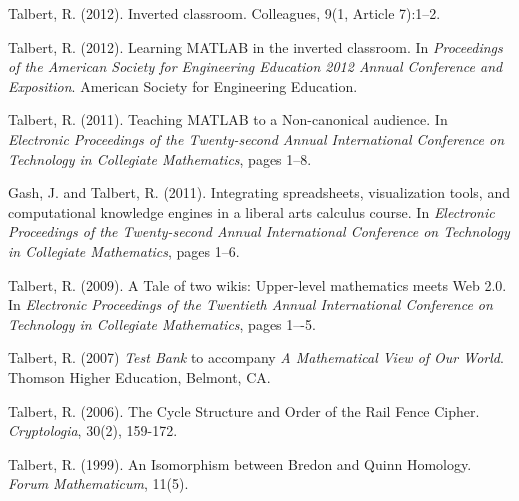 \documentclass[letterpaper]{article}
\renewenvironment{itemize}{
  \begin{list}{}{
    \setlength{\leftmargin}{1.5em}
	\setlength{\itemsep}{0in}
  }
}{
  \end{list}
}
\begin{document}
\begin{itemize}
	\item Talbert, R. (2012). Inverted classroom. Colleagues, 9(1, Article 7):1--2.
	\item Talbert, R. (2012). Learning MATLAB in the inverted classroom. In \textit{Proceedings of the American Society for Engineering Education 2012 Annual Conference and Exposition}. American Society for Engineering Education.
	\item Talbert, R. (2011). Teaching MATLAB to a Non-canonical audience. In \textit{Electronic Proceedings of the Twenty-second Annual International Conference on Technology in Collegiate Mathematics}, pages 1--8.
	\item Gash, J. and Talbert, R. (2011). Integrating spreadsheets, visualization tools, and computational knowledge engines in a liberal arts calculus course. In \textit{Electronic Proceedings of the Twenty-second Annual International Conference on Technology in Collegiate Mathematics}, pages 1--6.
	\item Talbert, R. (2009). A Tale of two wikis: Upper-level mathematics meets Web 2.0. In \textit{Electronic Proceedings of the Twentieth Annual International Conference on Technology in Collegiate Mathematics}, pages 1–-5.
	\item Talbert, R. (2007)  \emph{Test Bank} to accompany \emph{A Mathematical View of Our World}. Thomson Higher Education, Belmont, CA.
	\item Talbert, R. (2006). The Cycle Structure and Order of the Rail Fence Cipher. \textit{Cryptologia}, 30(2), 159-172.
	\item Talbert, R. (1999). An Isomorphism between Bredon and Quinn Homology. \textit{Forum Mathematicum}, 11(5).
\end{itemize}




% 
\end{document}
